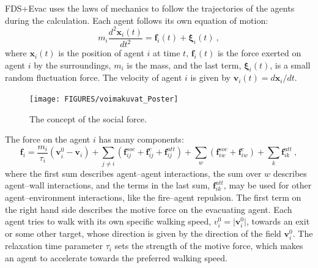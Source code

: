 \documentclass[12pt,a4paper,final,twoside]{stylevk}
\begin{document}
FDS+Evac uses the laws of mechanics to follow the trajectories of the
agents during the calculation.  Each agent follows its own equation of
motion:
%
\begin{equation}\label{Eq_motion}
   m_i \frac{d^2 \mathbf{x}_i (t)}{dt^2} = \mathbf{f}_i (t)  +
  {\boldsymbol  \xi}_i (t) ~,  
\end{equation}
%
where $\mathbf{x}_i (t)$ is the position of agent $i$ at time $t$,
$\mathbf{f}_i (t)$ is the force exerted on agent $i$ by the
surroundings, $m_i$ is the mass, and the last term, ${\boldsymbol
  \xi}_i (t)$, is a small random fluctuation force.  The velocity of
agent $i$ is given by $\mathbf{v}_i (t) = d\mathbf{x}_i/dt$.

%
\begin{figure}[tb]
  \centerline{\texttt{[image: FIGURES/voimakuvat\_Poster]}}
  \caption{The concept of the social force.}\label{Fig_SocForce}
\end{figure}
%

The force on the agent $i$ has many components:
%
\begin{equation}\label{Eq_force}
  \mathbf{f}_i = \frac{m_i}{\tau_i} \left( \mathbf{v}_i^0 -
    \mathbf{v}_i\right) + \sum_{j \ne i} \left( \mathbf{f}_{ij}^{soc}
    + \mathbf{f}_{ij}^{c} + \mathbf{f}_{ij}^{att} \right) + \sum_{w}
  \left( \mathbf{f}^{soc}_{iw} + \mathbf{f}^{c}_{iw} \right) + \sum_{k}
  \mathbf{f}_{ik}^{att} ~,
\end{equation}
%
where the first sum describes agent--agent interactions, the sum over
$w$ describes agent--wall interactions, and the terms in the last sum,
$\mathbf{f}_{ik}^{att}$, may be used for other agent--environment
interactions, like the fire--agent repulsion.  The first term on the
right hand side describes the motive force on the evacuating agent.
Each agent tries to walk with its own specific walking speed, $v^0_i =
\vert \mathbf{v}_i^0 \vert$, towards an exit or some other target,
whose direction is given by the direction of the field $
\mathbf{v}_i^0 $.  The relaxation time parameter $\tau_i$ sets the
strength of the motive force, which makes an agent to accelerate
towards the preferred walking speed.
\end{document}
